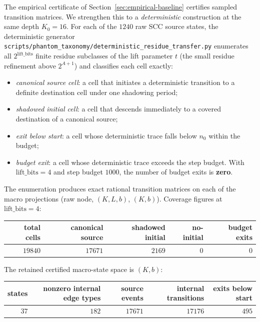 \documentclass[11pt,a4paper]{article}
\theoremstyle{definition}
\begin{document}
The empirical certificate of Section~\ref{sec:empirical-baseline}
certifies sampled transition matrices. We strengthen this to a
\emph{deterministic} construction at the same depth $K_0 = 16$.
For each of the $1240$ raw SCC source states, the deterministic
generator
\verb|scripts/phantom_taxonomy/deterministic_residue_transfer.py|
enumerates all $2^{\mathrm{lift\_bits}}$ finite residue subclasses
of the lift parameter $t$ (the small residue refinement above
$2^{A + 1}$) and classifies each cell exactly:
\begin{itemize}
  \item \emph{canonical source cell}: a cell that initiates a
        deterministic transition to a definite destination cell
        under one shadowing period;
  \item \emph{shadowed initial cell}: a cell that descends
        immediately to a covered destination of a canonical
        source;
  \item \emph{exit below start}: a cell whose deterministic
        trace falls below $n_0$ within the budget;
  \item \emph{budget exit}: a cell whose deterministic trace
        exceeds the step budget. With
        $\mathrm{lift\_bits} = 4$ and step budget $1000$, the
        number of budget exits is \textbf{zero}.
\end{itemize}
The enumeration produces exact rational transition matrices on
each of the macro projections (raw node, $(K,L,b)$, $(K,b)$).
Coverage figures at $\mathrm{lift\_bits} = 4$:
\begin{center}
\begin{tabular}{rrrrr}
\toprule
total cells & canonical source & shadowed initial &
no-initial & budget exits \\
\midrule
$19840$ & $17671$ & $2169$ & $0$ & $0$ \\
\bottomrule
\end{tabular}
\end{center}
The retained certified macro-state space is $(K, b)$:
\begin{center}
\begin{tabular}{rrrrr}
\toprule
states & nonzero internal edge types &
source events & internal transitions & exits below start \\
\midrule
$37$ & $182$ & $17671$ & $17176$ & $495$ \\
\bottomrule
\end{tabular}
\end{center}
\end{document}
